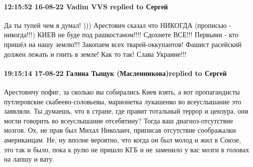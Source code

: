  
 
 
 
 

\paragraph{12:15:52 16-08-22 Vadim VVS replied to Сергей}

Да ты тупей чем я думал! ))) Арестович сказал что НИКОГДА (прописью -
никогда!!!) КИЕВ не буде под рашкостаном!!!! Сдохнете ВСЕ!!! Первыми - кто
пришёл на нашу землю!!! Закопаем всех тварей-оккупантов! Фашист расейский
должен лежать и гнить в земле! Как то так! Слава Украине!!!

\paragraph{19:15:14 17-08-22 Галина Тыщук (Масленникова)replied to Сергей}

Арестовичу пофиг, за сколько вы собирались Киев взять, а вот пропагандисты
путлеровские скабеево-соловьевы, марионетка лукашенко во всеуслышание это
заявляли. Ты думаешь, что в стране, где правит тотальный террор и цензура, они
могли говорить во всеуслышание отсебятину? Тогда ваш диагноз-отсутствие мозгов.
Ох, не прав был Михал Николаич, приписав отсутствие соображалки американцам.
Не, ну вполне вероятно, что когда он был молод и жил в Союзе, это так и было,
пока к рулю не пришло КГБ и не заменило у вас мозги в головах на лапшу и вату.
